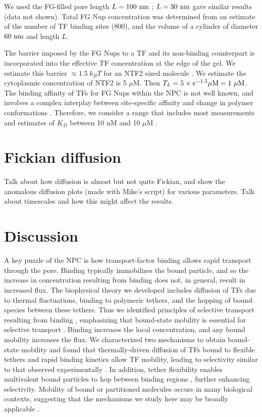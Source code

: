 We used the FG-filled pore length $L = 100\ \nm$
\cite{frenkiel-krispin10, maimon12}; $L=30\ {\rm nm}$ gave similar results (data not shown).  Total FG Nup concentration was determined from an estimate of the number of TF binding sites ($800$), and the volume of a cylinder of diameter $60\ \nm$ and length $L$.  


 The barrier imposed by the FG Nups to a TF and
its non-binding counterpart is incorporated into the effective TF
concentration at the edge of the gel.  We estimate this barrier
$\approx 1.5\ k_B T$ for an NTF2 sized molecule \cite{timney16}.  We
estimate the cytoplasmic concentration of NTF2 is 5 $\mu$M.  Then
$T_L= 5 \times e^{-1.5} \mu \mathrm{M} = 1 \mathrm{\ \mu M}$.  The binding
affinity of TFs for FG Nups within the NPC is not well known, and
involves a complex interplay between site-specific affinity and change
in polymer conformations \cite{vovk16}.  Therefore, we consider a
range that includes most measurements and estimates of $K_D$ between
10 nM and 10 $\mu$M \cite{pyhtila03, gilchrist02, tetenbaum-novatt12-1,
  milles15, timney16, vovk16}.  

\section{Fickian diffusion}
\label{sec:fickian}
Talk about how diffusion is almost but not quite Fickian, and show the anomalous diffusion plots (made with Mike's script) for various parameters. Talk about timescales and how this might affect the results.

\section{Discussion}
A key puzzle of the NPC is how transport-factor binding allows rapid transport through the pore.  Binding typically immobilizes the bound particle, and so the increase in concentration resulting from binding does not, in general, result in increased flux. The biophysical theory
we developed includes diffusion of TFs due to thermal fluctuations,
binding to polymeric tethers, and the hopping of bound species between
these tethers.  Thus we identified principles of selective transport
resulting from binding , emphasizing that
bound-state mobility is essential for selective transport
.  Binding increases the local concentration,
and any bound mobility increases the flux.  We characterized two
mechanisms to obtain bound-state mobility and found that
thermally-driven diffusion of TFs bound to flexible tethers and rapid
binding kinetics \cite{hough15, milles15} allow TF mobility, leading
to selectivity similar to that observed experimentally
.  In addition, tether flexibility enables
multivalent bound particles to hop between binding regions
 \cite{lowe15, schoch12}, further enhancing
selectivity. Mobility of bound or partitioned molecules occurs in many
biological contexts, suggesting that the mechanisms we study here may
be broadly applicable \cite{stefferson17, braga07}.


